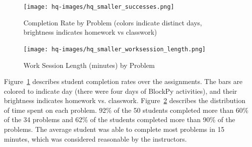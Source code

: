 \documentclass[10pt,journal,compsoc]{IEEEtran}
\begin{document}
\begin{figure}[!h]
    \centering
    \texttt{[image: hq-images/hq\_smaller\_successes.png]}
    \vspace{-\bigskipamount}
    \vspace{-\bigskipamount}
    \vspace{-\medskipamount}
    \caption{Completion Rate by Problem (colors indicate distinct days, brightness indicates homework vs classwork)}
    \label{fig:success-over-problems}
    \vspace{-\medskipamount}
\end{figure}

\begin{figure}[!h]
    \centering
    \texttt{[image: hq-images/hq\_smaller\_worksession\_length.png]}
    \vspace{-\bigskipamount}
    \vspace{-\medskipamount}
    \caption{Work Session Length (minutes) by Problem}
    \label{fig:total-session-length}
\end{figure}

Figure~\ref{fig:success-over-problems} describes student completion rates over the assignments.
The bars are colored to indicate day (there were four days of BlockPy activities), and their brightness indicates homework vs. classwork.
Figure~\ref{fig:total-session-length} describes the distribution of time spent on each problem.
92\% of the 50 students completed more than 60\% of the 34 problems and 62\% of the students completed more than 90\% of the problems.
The average student was able to complete most problems in 15 minutes, which was considered reasonable by the instructors.

\end{document}
